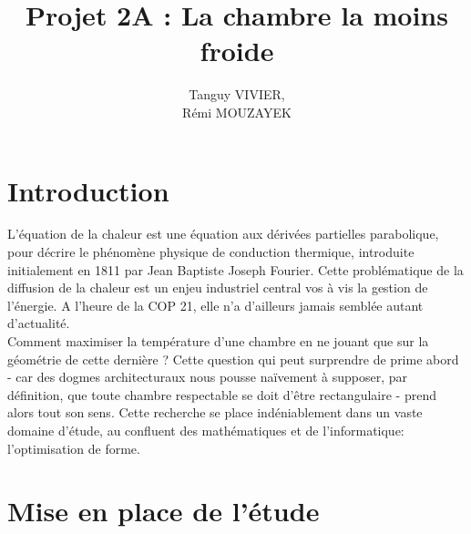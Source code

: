 \documentclass[a4paper,reqno]{article}
\begin{document}
\title{Projet 2A : La chambre la moins froide}
\author{Tanguy VIVIER, \\
Rémi MOUZAYEK}
\maketitle
\newpage

\setlength{\parindent}{1cm}
\part*{Introduction}
L'équation de la chaleur est une équation aux dérivées partielles 
parabolique, pour décrire le phénomène physique de conduction thermique, introduite initialement en 1811 par Jean Baptiste Joseph Fourier. Cette problématique de la diffusion de la chaleur est un enjeu industriel central vos à vis la gestion de l'énergie. A l'heure de la COP 21, elle n'a d'ailleurs jamais semblée autant d'actualité. \\
Comment maximiser la température d'une chambre en ne jouant que sur la géométrie de cette dernière ? Cette question qui peut surprendre de prime abord - car des dogmes architecturaux nous pousse naïvement à supposer, par définition, que toute chambre respectable se doit d'être rectangulaire - prend alors tout son sens.
Cette recherche se place indéniablement dans un vaste domaine d'étude, au confluent des mathématiques et de l'informatique: l'optimisation de forme. \\


\part{Mise en place de l'étude}
\end{document}
